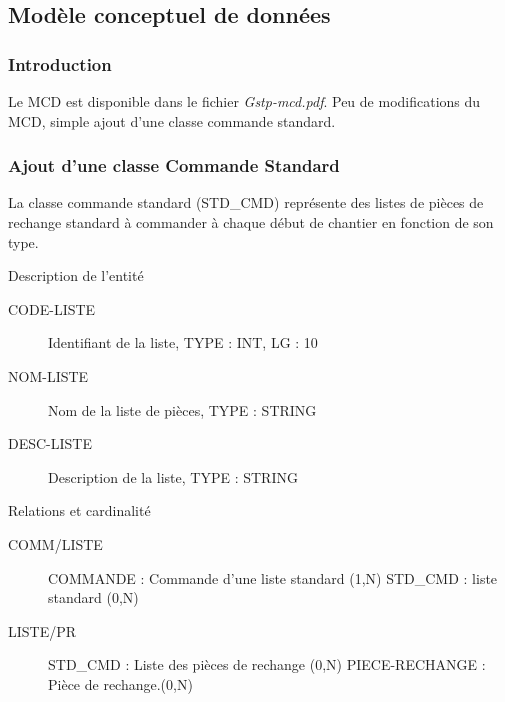 \subsection{Modèle conceptuel de données}

\subsubsection{Introduction}
Le MCD est disponible dans le fichier {\sl Gstp-mcd.pdf}.
Peu de modifications du MCD, simple ajout d'une classe commande standard.


\subsubsection{Ajout d'une classe Commande Standard}

La classe commande standard (STD\_CMD) représente des listes de pièces de 
rechange standard à commander à chaque début de chantier en fonction de son type.

\par{Description de l'entité}
\begin{description}
    \item[CODE-LISTE] Identifiant de la liste, TYPE : INT, LG : 10
    \item[NOM-LISTE] Nom de la liste de pièces, TYPE : STRING
    \item[DESC-LISTE] Description de la liste, TYPE : STRING
\end{description}

\par{Relations et cardinalité}
\begin{description}
    \item[COMM/LISTE] COMMANDE : Commande d'une liste standard (1,N)\el
        STD\_CMD : liste standard (0,N)
    \item[LISTE/PR] STD\_CMD : Liste des pièces de rechange (0,N)\el
        PIECE-RECHANGE :  Pièce de rechange.(0,N)
\end{description}

